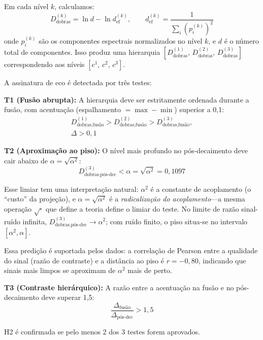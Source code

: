 \documentclass[12pt,a4paper,twocolumn]{article}
\newcommand{\alphaii}{\alpha^{2}}
\newcommand{\Dfolds}{D_{\text{dobras}}}
\begin{document}
Em cada nível $k$, calculamos:
\begin{equation}
\Dfolds^{(k)} = \ln d - \ln d_{\text{ef}}^{(k)}, \qquad d_{\text{ef}}^{(k)} = \frac{1}{\sum_i (p_i^{(k)})^2}
\end{equation}
onde $p_i^{(k)}$ são os componentes espectrais normalizados no nível $k$, e $d$ é o número total de componentes. Isso produz uma hierarquia $[\Dfolds^{(1)},\, \Dfolds^{(2)},\, \Dfolds^{(3)}]$ correspondendo aos níveis $[c^1,\, c^2,\, c^3]$.

A assinatura de eco é detectada por três testes:

\textbf{T1 (Fusão abrupta):} A hierarquia deve ser estritamente ordenada durante a fusão, com acentuação (espalhamento $= \max - \min$) superior a 0{,}1:
\begin{multline}
D_{\text{dobras,fusão}}^{(1)} > D_{\text{dobras,fusão}}^{(2)} > D_{\text{dobras,fusão}}^{(3)}, \\
\Delta > 0{,}1
\end{multline}

\textbf{T2 (Aproximação ao piso):} O nível mais profundo no pós-decaimento deve cair abaixo de $\alpha = \sqrt{\alphaii}$:
\begin{equation}
\label{eq:T2}
D_{\text{dobras},\text{pós-dec}}^{(3)} < \alpha = \sqrt{\alphaii} = 0{,}1097
\end{equation}

Esse limiar tem uma interpretação natural: $\alphaii$ é a constante de acoplamento (o ``custo'' da projeção), e $\alpha = \sqrt{\alphaii}$ é a \emph{radicalização do acoplamento}---a mesma operação $\sqrt{\cdot}$ que define a teoria define o limiar do teste. No limite de razão sinal-ruído infinita, $D_{\text{dobras},\text{pós-dec}}^{(3)} \to \alphaii$; com ruído finito, o piso situa-se no intervalo $[\alphaii, \alpha]$.

Essa predição é suportada pelos dados: a correlação de Pearson entre a qualidade do sinal (razão de contraste) e a distância ao piso é $r = -0{,}80$, indicando que sinais mais limpos se aproximam de $\alphaii$ mais de perto.

\textbf{T3 (Contraste hierárquico):} A razão entre a acentuação na fusão e no pós-decaimento deve superar 1{,}5:
\begin{equation}
\frac{\Delta_{\text{fusão}}}{\Delta_{\text{pós-dec}}} > 1{,}5
\end{equation}

H2 é confirmada se pelo menos 2 dos 3 testes forem aprovados.
\end{document}

